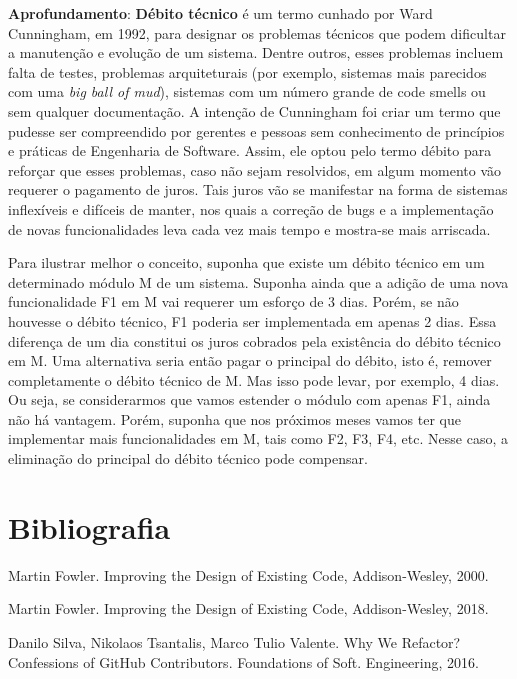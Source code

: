 \documentclass[
  11pt,
  twoside]{book}
\newenvironment{esmbox}{\centering \vspace{1.5ex} \begin{tcolorbox}[breakable, colback=backcolor, width=4.9in]}{\end{tcolorbox} \vspace{1.5ex}}
\begin{document}
\begin{esmbox}

\textbf{Aprofundamento}: \textbf{Débito técnico} é um termo cunhado por
Ward Cunningham, em 1992, para designar os problemas técnicos que podem
dificultar a manutenção e evolução de um sistema. Dentre outros, esses
problemas incluem falta de testes, problemas arquiteturais (por exemplo,
sistemas mais parecidos com uma \emph{big ball of mud}), sistemas com um
número grande de code smells ou sem qualquer documentação. A intenção de
Cunningham foi criar um termo que pudesse ser compreendido por gerentes
e pessoas sem conhecimento de princípios e práticas de Engenharia de
Software. Assim, ele optou pelo termo débito para reforçar que esses
problemas, caso não sejam resolvidos, em algum momento vão requerer o
pagamento de juros. Tais juros vão se manifestar na forma de sistemas
inflexíveis e difíceis de manter, nos quais a correção de bugs e a
implementação de novas funcionalidades leva cada vez mais tempo e
mostra-se mais arriscada.

Para ilustrar melhor o conceito, suponha que existe um débito técnico em
um determinado módulo M de um sistema. Suponha ainda que a adição de uma
nova funcionalidade F1 em M vai requerer um esforço de 3 dias. Porém, se
não houvesse o débito técnico, F1 poderia ser implementada em apenas 2
dias. Essa diferença de um dia constitui os juros cobrados pela
existência do débito técnico em M. Uma alternativa seria então pagar o
principal do débito, isto é, remover completamente o débito técnico de
M. Mas isso pode levar, por exemplo, 4 dias. Ou seja, se considerarmos
que vamos estender o módulo com apenas F1, ainda não há vantagem. Porém,
suponha que nos próximos meses vamos ter que implementar mais
funcionalidades em M, tais como F2, F3, F4, etc. Nesse caso, a
eliminação do principal do débito técnico pode compensar.

\end{esmbox}

\hypertarget{bibliografia-8}{%
\section*{Bibliografia}\label{bibliografia-8}}

Martin Fowler. Improving the Design of Existing Code, Addison-Wesley,
2000.

Martin Fowler. Improving the Design of Existing Code, Addison-Wesley,
2018.

Danilo Silva, Nikolaos Tsantalis, Marco Tulio Valente. Why We Refactor?
Confessions of GitHub Contributors. Foundations of Soft. Engineering,
2016.
\end{document}
